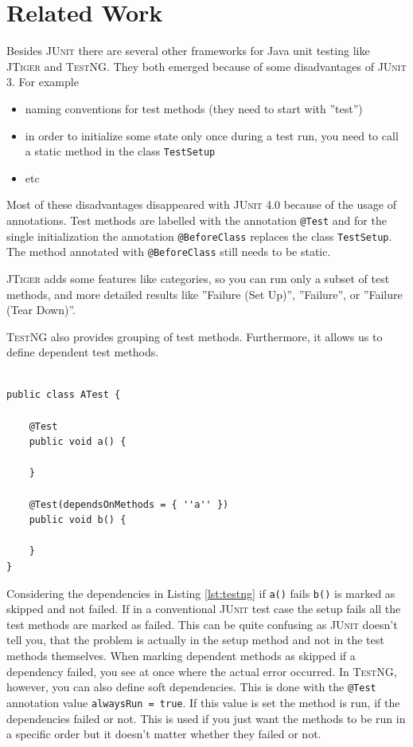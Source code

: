 \documentclass[11pt]{article}
\makeatletter
\newcommand{\JUnit}{\textsc{JUnit}\xspace}
\newcommand{\TestNG}{\textsc{TestNG}\xspace}
\newcommand{\JTiger}{\textsc{JTiger}\xspace}
\newcommand{\ttt}[1]{\texttt{#1}}
\newcommand{\attest}{\ttt{@Test}\xspace}
\makeatother
\begin{document}
\section{Related Work}

Besides \JUnit there are several other frameworks for Java unit testing like \JTiger and \TestNG. They both emerged because of some disadvantages of \JUnit 3. For example

\begin{itemize}
 \item naming conventions for test methods (they need to start with ''test'')
 \item in order to initialize some state only once during a test run, you need to call a static method in the class \ttt{TestSetup}
 \item etc
\end{itemize}

Most of these disadvantages disappeared with \JUnit 4.0 because of the usage of annotations. Test methods are labelled with the annotation \attest and for the single initialization the annotation \ttt{@BeforeClass} replaces the class \ttt{TestSetup}. The method annotated with \ttt{@BeforeClass} still needs to be static.

\JTiger adds some features like categories, so you can run only a subset of test methods, and more detailed results like ''Failure (Set Up)'', ''Failure'', or ''Failure (Tear Down)''.

\TestNG also provides grouping of test methods. Furthermore, it allows us to define dependent test methods.

\begin{lstlisting}[label=lst:testng,caption=Dependent test methods with \TestNG.]

public class ATest {

	@Test
	public void a() {
		
	}
	
	@Test(dependsOnMethods = { ''a'' })
	public void b() {
	
	}
}

\end{lstlisting}

Considering the dependencies in Listing \ref{lst:testng} if \ttt{a()} fails \ttt{b()} is marked as skipped and not failed. If in a conventional \JUnit test case the setup fails all the test methods are marked as failed. This can be quite confusing as \JUnit doesn't tell you, that the problem is actually in the setup method and not in the test methods themselves. When marking dependent methods as skipped if a dependency failed, you see at once where the actual error occurred. In \TestNG, however, you can also define soft dependencies. This is done with the \attest annotation value \ttt{alwaysRun = true}. If this value is set the method is run, if the dependencies failed or not. This is used if you just want the methods to be run in a specific order but it doesn't matter whether they failed or not.
\end{document}
